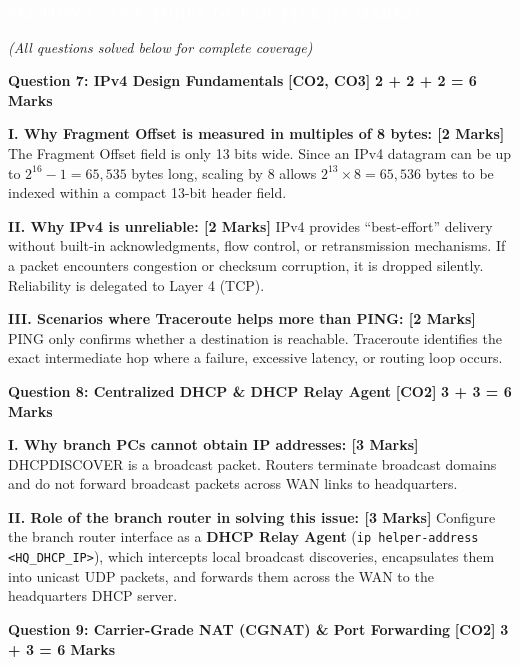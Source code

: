 \documentclass[11pt,a4paper]{article}
\newcommand{\questionheader}[3]{
    \vspace{0.35cm}
    \noindent\colorbox{qboxbg}{
        \parbox{\dimexpr\textwidth-2\fboxsep\relax}{
            \textbf{\textcolor{primary}{\large #1}} \hfill \textbf{\textcolor{accent}{[#2]}} \hfill \textbf{\textcolor{secondary}{#3 Marks}}
        }
    }
    \vspace{0.15cm}
}
\newcommand{\sectionbanner}[1]{
    \vspace{0.5cm}
    \noindent\colorbox{primary}{
        \parbox{\dimexpr\textwidth-2\fboxsep\relax}{
            \centering \textbf{\textcolor{white}{\Large #1}}
        }
    }
    \vspace{0.25cm}
}
\begin{document}
\newpage
\sectionbanner{SECTION C: ANY THREE OUT OF FIVE (18 MARKS)}
\textit{(All questions solved below for complete coverage)}

\questionheader{Question 7: IPv4 Design Fundamentals}{CO2, CO3}{2 + 2 + 2 = 6}

\textbf{I. Why Fragment Offset is measured in multiples of 8 bytes: [2 Marks]}
The Fragment Offset field is only 13 bits wide. Since an IPv4 datagram can be up to $2^{16} - 1 = 65,535$ bytes long, scaling by 8 allows $2^{13} \times 8 = 65,536$ bytes to be indexed within a compact 13-bit header field.

\textbf{II. Why IPv4 is unreliable: [2 Marks]}
IPv4 provides ``best-effort'' delivery without built-in acknowledgments, flow control, or retransmission mechanisms. If a packet encounters congestion or checksum corruption, it is dropped silently. Reliability is delegated to Layer 4 (TCP).

\textbf{III. Scenarios where Traceroute helps more than PING: [2 Marks]}
PING only confirms whether a destination is reachable. Traceroute identifies the exact intermediate hop where a failure, excessive latency, or routing loop occurs.

\questionheader{Question 8: Centralized DHCP \& DHCP Relay Agent}{CO2}{3 + 3 = 6}

\textbf{I. Why branch PCs cannot obtain IP addresses: [3 Marks]}
DHCPDISCOVER is a broadcast packet. Routers terminate broadcast domains and do not forward broadcast packets across WAN links to headquarters.

\textbf{II. Role of the branch router in solving this issue: [3 Marks]}
Configure the branch router interface as a \textbf{DHCP Relay Agent} (\texttt{ip helper-address <HQ\_DHCP\_IP>}), which intercepts local broadcast discoveries, encapsulates them into unicast UDP packets, and forwards them across the WAN to the headquarters DHCP server.

\questionheader{Question 9: Carrier-Grade NAT (CGNAT) \& Port Forwarding}{CO2}{3 + 3 = 6}
\end{document}
